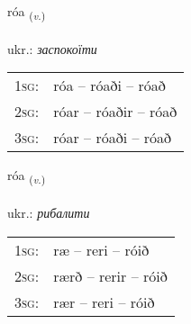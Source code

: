 \documentclass[frontgrid, backgrid]{flacards}\usepackage[]{graphicx}\usepackage[]{xcolor}
\begin{document}
\renewcommand{\flhead}{\vskip5pt \fboxsep=0pt {\small\bfseries\footnotesize Sagnorð | дієслово}}
\renewcommand{\fcfoot}{\vskip5pt \fboxsep=0pt \hspace{2pt}{\small\bfseries\footnotesize 3K}}

\renewcommand{\blhead}{\vskip5pt {\small\bfseries\footnotesize Sagnorð | дієслово }}
\renewcommand{\bcfoot}{\vskip5pt \hspace{2pt}{\small\bfseries\footnotesize 3K}}


{róa \small{\textsubscript{(\textit{v.})}} \\[1ex] %
\textphonetic{[rouːa]} \\
ukr.: \emph{заспокоїти} \\  [2ex]
\renewcommand*{\arraystretch}{0.8}
\begin{tabular}{p{1cm}l}
\textsc{1sg}: & róa -- róaði -- róað \\ 
\textsc{2sg}: & róar -- róaðir -- róað \\ 
\textsc{3sg}: & róar -- róaði -- róað \\ 
\end{tabular}
}

\renewcommand{\flhead}{\vskip5pt \fboxsep=0pt {\small\bfseries\footnotesize Sagnorð | дієслово}}
\renewcommand{\fcfoot}{\vskip5pt \fboxsep=0pt \hspace{2pt}{\small\bfseries\footnotesize 3K}}

\renewcommand{\blhead}{\vskip5pt {\small\bfseries\footnotesize Sagnorð | дієслово }}
\renewcommand{\bcfoot}{\vskip5pt \hspace{2pt}{\small\bfseries\footnotesize 3K}}


{róa \small{\textsubscript{(\textit{v.})}} \\[1ex] %
\textphonetic{[rouːa]} \\
ukr.: \emph{рибалити} \\  [2ex]
\renewcommand*{\arraystretch}{0.8}
\begin{tabular}{p{1cm}l}
\textsc{1sg}: & ræ -- reri -- róið \\ 
\textsc{2sg}: & rærð -- rerir -- róið \\ 
\textsc{3sg}: & rær -- reri -- róið \\ 
\end{tabular}
}
\end{document}
